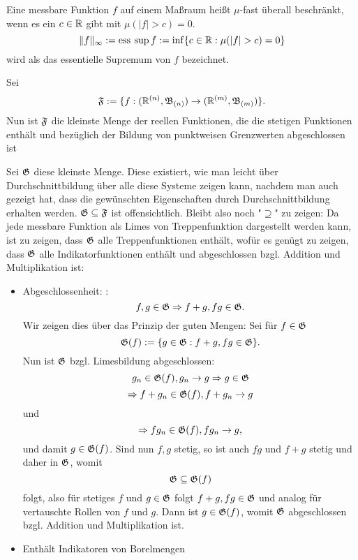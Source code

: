 			\begin{defi}
				Eine messbare Funktion $f$ auf einem Maßraum heißt $\mu$-fast überall beschränkt, wenn es ein $c\in\mathbb{R}$ gibt mit $\mu(|f|>c)=0$.
				\[ \lVert f\rVert_\infty:=\esssup f:=\inf\{c\in\R: \mu(|f|>c)=0\} \]
				wird als das essentielle Supremum von $f$ bezeichnet. 
			\end{defi}
			
			\begin{satz}
				Sei \[ \mathfrak{F}:=\{f:(\mathbb{R}^{(n)},\mathfrak{B}_{(n)})\to(\mathbb{R}^{(m)},\mathfrak{B}_{(m)})\}. \]
				Nun ist $\mathfrak{F}$ die kleinste Menge der reellen Funktionen, die die stetigen Funktionen enthält und bezüglich der Bildung von punktweisen Grenzwerten abgeschlossen ist
			\end{satz}
			
			\begin{bew}
				Sei $\mathfrak{G}$ diese kleinste Menge. Diese existiert, wie man leicht über Durchschnittbildung über alle diese Systeme zeigen kann, nachdem man auch gezeigt hat, dass die gewünschten Eigenschaften durch Durchschnittbildung erhalten werden.\newline
				$\mathfrak{G}\subseteq \mathfrak{F}$ ist offensichtlich. Bleibt also noch "$\supseteq$" zu zeigen:\newline
				Da jede messbare Funktion als Limes von Treppenfunktion dargestellt werden kann, ist zu zeigen, dass $\mathfrak{G}$ alle Treppenfunktionen enthält, wofür es genügt zu zeigen, dass $\mathfrak{G}$ alle Indikatorfunktionen enthält und abgeschlossen bzgl. Addition und Multiplikation ist:
				\begin{itemize}
					\item Abgeschlossenheit:\newline
					\zz:
					\[ f,g\in\mathfrak{G}\Rightarrow f+g,fg\in\mathfrak{G}. \]
					Wir zeigen dies über das Prinzip der guten Mengen: Sei für $f\in\mathfrak{G}$
					\[ \mathfrak{G}(f):=\{g\in\mathfrak{G}: f+g,fg\in\mathfrak{G}\}. \]
					Nun ist $\mathfrak{G}$ bzgl. Limesbildung abgeschlossen:
					\[ g_n\in\mathfrak{G}(f), g_n\to g\Rightarrow g\in\mathfrak{G} \]
					\[ \Rightarrow f+g_n\in\mathfrak{G}(f), f+g_n\to g \]
					und
					\[ \Rightarrow fg_n\in\mathfrak{G}(f), fg_n\to g, \]
					und damit $g\in \mathfrak{G}(f)$. Sind nun $f,g$ stetig, so ist auch $fg$ und $f+g$ stetig und daher in $\mathfrak{G}$, womit
					\[ \mathfrak{G}\subseteq \mathfrak{G}(f) \]
					folgt, also für stetiges $f$ und $g\in\mathfrak{G}$ folgt $f+g, fg\in\mathfrak{G}$ und analog für vertauschte Rollen von $f$ und $g$. Dann ist $g\in\mathfrak{G}(f)$, womit $\mathfrak{G}$ abgeschlossen bzgl. Addition und Multiplikation ist. 
					\item Enthält Indikatoren von Borelmengen

\end{itemize}
\end{bew}

